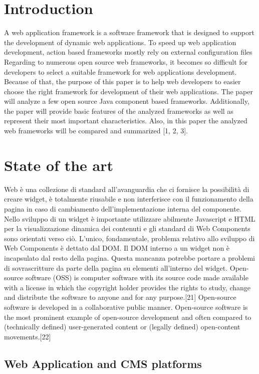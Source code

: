 \documentclass{sig-alternate}
\begin{document}
\section{Introduction}

A web application framework is a software framework that is designed to support the development of dynamic web applications.
To speed up web application development, action based frameworks mostly rely on external configuration files
Regarding to numerous open source web frameworks, it becomes so difficult for developers to select a suitable framework for web applications development. Because of that, the purpose of this paper is to help web developers to easier choose the right framework for development of their web applications. The paper will analyze a few open source Java component based frameworks. Additionally, the paper will provide basic features of the analyzed frameworks as well as represent their most important characteristics. Also, in this paper the analyzed web frameworks will be compared and summarized [1, 2, 3].

\section{State of the art}

Web  è una collezione di standard all’avanguardia che ci fornisce la possibilità di creare widget, è totalmente riusabile e non interferisce con il funzionamento della pagina in caso di cambiamento dell’implementazione interna del componente.
Nello sviluppo di un widget è importante utilizzare abilmente Javascript e HTML per la visualizzazione dinamica dei contenuti e gli standard di Web Components sono orientati verso ciò. L’unico, fondamentale, problema relativo allo sviluppo di Web Components è dettato dal DOM. Il DOM interno a un widget non è incapsulato dal resto della pagina. Questa mancanza potrebbe portare a problemi di sovrascritture da parte della pagina su elementi all’interno del widget.
Open-source software (OSS) is computer software with its source code made available with a license in which the copyright holder provides the rights to study, change and distribute the software to anyone and for any purpose.[21] Open-source software is developed in a collaborative public manner. Open-source software is the most prominent example of open-source development and often compared to (technically defined) user-generated content or (legally defined) open-content movements.[22]

\subsection{Web Application and CMS platforms}
\end{document}
